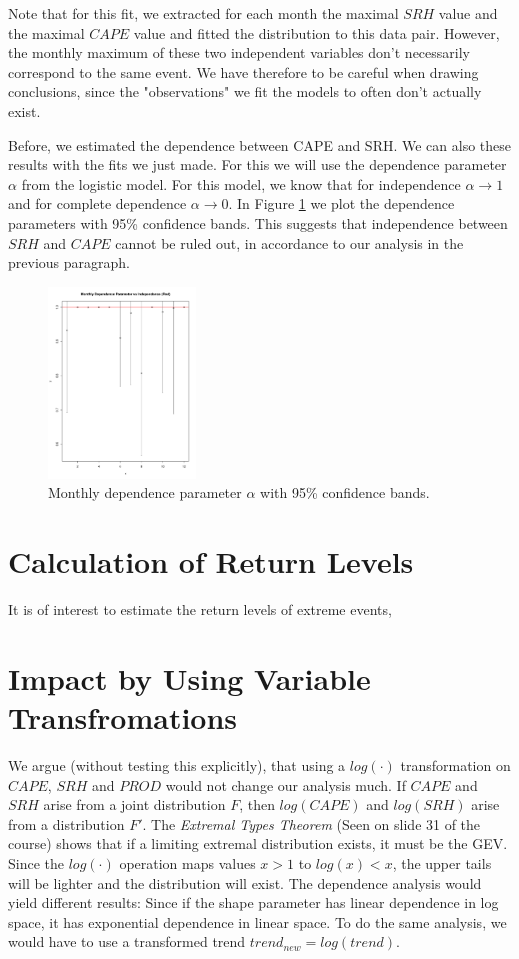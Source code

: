 \documentclass[10pt,conference,compsocconf]{IEEEtran}
\begin{document}
Note that for this fit, we extracted for each month the maximal $SRH$ value and the maximal $CAPE$ value and fitted the distribution to this data pair. However, the monthly maximum of these two independent variables don't necessarily correspond to the same event. We have therefore to be careful when drawing conclusions, since the "observations" we fit the models to often don't actually exist.
\par
Before, we estimated the dependence between CAPE and SRH. We can also these results with the fits we just made. For this we will use the dependence parameter $\alpha$ from the logistic model. For this model, we know that for independence $\alpha \to 1$ and for complete dependence $\alpha \to 0$. In Figure \ref{fig:cape_srh_dependance_logistic} we plot the dependence parameters with 95\% confidence bands. This suggests that independence between $SRH$ and $CAPE$ cannot be ruled out, in accordance to our analysis in the previous paragraph.

\begin{figure}
	\centering
	\includegraphics[width=0.35\textwidth]{../plots/dependance_parameter_cape_srh_logistic.pdf}
	\caption{Monthly dependence parameter $\alpha$ with 95\% confidence bands.}
	\label{fig:cape_srh_dependance_logistic}
\end{figure}

\section*{Calculation of Return Levels}
It is of interest to estimate the return levels of extreme events, 


\section*{Impact by Using Variable Transfromations}
We argue (without testing this explicitly), that using a $log(\cdot)$ transformation on $CAPE$, $SRH$ and $PROD$ would not change our analysis much. If $CAPE$ and $SRH$ arise from a joint distribution $F$, then $log(CAPE)$ and $log(SRH)$ arise from a distribution $F'$. The \textit{Extremal Types Theorem} (Seen on slide 31 of the course) shows that if a limiting extremal distribution exists, it must be the GEV. Since the $log(\cdot)$ operation maps values $x>1$ to $log(x)<x$, the upper tails will be lighter and the distribution will exist. The dependence analysis would yield different results: Since if the shape parameter has linear dependence in log space, it has exponential dependence in linear space. To do the same analysis, we would have to use a transformed trend $trend_{new}= log(trend)$. 
\end{document}
